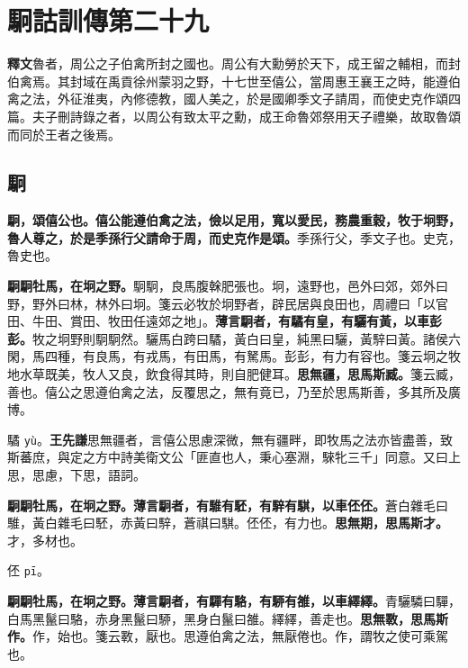 \chapter{駉詁訓傳第二十九}

\begin{quoting}\textbf{釋文}魯者，周公之子伯禽所封之國也。周公有大勳勞於天下，成王留之輔相，而封伯禽焉。其封域在禹貢徐州蒙羽之野，十七世至僖公，當周惠王襄王之時，能遵伯禽之法，外征淮夷，內修德教，國人美之，於是國卿季文子請周，而使史克作頌四篇。夫子刪詩錄之者，以周公有致太平之勳，成王命魯郊祭用天子禮樂，故取魯頌而同於王者之後焉。\end{quoting}

\section{駉}


\textbf{駉，頌僖公也。僖公能遵伯禽之法，儉以足用，寬以愛民，務農重穀，牧于坰野，魯人尊之，於是季孫行父請命于周，而史克作是頌。}{\footnotesize 季孫行父，季文子也。史克，魯史也。}

\textbf{駉駉牡馬，在坰之野。}{\footnotesize 駉駉，良馬腹榦肥張也。坰，遠野也，邑外曰郊，郊外曰野，野外曰林，林外曰坰。箋云必牧於坰野者，辟民居與良田也，周禮曰「以官田、牛田、賞田、牧田任遠郊之地」。}\textbf{薄言駉者，有驈有皇，有驪有黃，以車彭彭。}{\footnotesize 牧之坰野則駉駉然。驪馬白跨曰驈，黃白曰皇，純黑曰驪，黃騂曰黃。諸侯六閑，馬四種，有良馬，有戎馬，有田馬，有駑馬。彭彭，有力有容也。箋云坰之牧地水草既美，牧人又良，飲食得其時，則自肥健耳。}\textbf{思無疆，思馬斯臧。}{\footnotesize 箋云臧，善也。僖公之思遵伯禽之法，反覆思之，無有竟已，乃至於思馬斯善，多其所及廣博。}

\begin{quoting}驈 \texttt{yù}。\textbf{王先謙}思無疆者，言僖公思慮深微，無有疆畔，即牧馬之法亦皆盡善，致斯蕃庶，與定之方中詩美衛文公「匪直也人，秉心塞淵，騋牝三千」同意。又曰上思，思慮，下思，語詞。\end{quoting}

\textbf{駉駉牡馬，在坰之野。薄言駉者，有騅有駓，有騂有騏，以車伾伾。}{\footnotesize 蒼白雜毛曰騅，黃白雜毛曰駓，赤黃曰騂，蒼祺曰騏。伾伾，有力也。}\textbf{思無期，思馬斯才。}{\footnotesize 才，多材也。}

\begin{quoting}伾 \texttt{pī}。\end{quoting}

\textbf{駉駉牡馬，在坰之野。薄言駉者，有驒有駱，有駵有雒，以車繹繹。}{\footnotesize 青驪驎曰驒，白馬黑鬣曰駱，赤身黑鬣曰駵，黑身白鬣曰雒。繹繹，善走也。}\textbf{思無斁，思馬斯作。}{\footnotesize 作，始也。箋云斁，厭也。思遵伯禽之法，無厭倦也。作，謂牧之使可乘駕也。}

